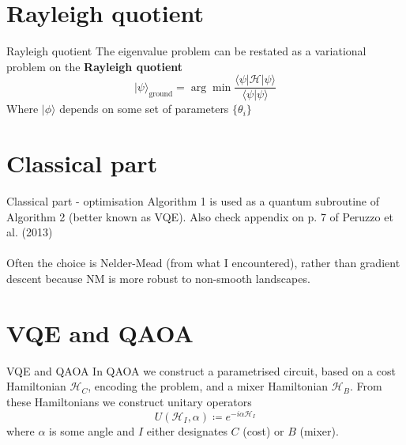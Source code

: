 \documentclass{beamer}
\renewcommand{\exp}[1]{\langle #1 \rangle} %
\begin{document}
\section{Rayleigh quotient}
\begin{frame}{Rayleigh quotient}
The eigenvalue problem can be restated as a variational problem on the \textbf{Rayleigh quotient}
\begin{equation}
	|\psi\rangle_{\text{ground}} = {\arg \min} \frac{\exp{\psi |\mathcal{H}|\psi}}{\exp{\psi|\psi}}
	\label{rayleigh}
\end{equation}
Where $|\phi\rangle$ depends on some set of parameters $\{\theta_i\}$

\end{frame}


\section{Classical part}
\begin{frame}{Classical part - optimisation}
	Algorithm 1 is used as a quantum subroutine of Algorithm 2 (better known as VQE). Also check appendix on p. 7 of Peruzzo et al. (2013)
	\\~\\
	Often the choice is Nelder-Mead (from what I encountered), rather than gradient descent because NM is more robust to non-smooth landscapes.
\end{frame}

\section{VQE and QAOA}
\begin{frame}{VQE and QAOA}
In QAOA we construct a parametrised circuit, based on a cost Hamiltonian $\mathcal{H}_C$, encoding the problem, and a mixer Hamiltonian $\mathcal{H}_B$. From these Hamiltonians we construct unitary operators
\begin{equation}
	U(\mathcal{H}_I,\alpha) \coloneq e^{-i\alpha \mathcal{H}_I}
\end{equation}
where $\alpha$ is some angle and $I$ either designates $C$ (cost) or $B$ (mixer).
\end{frame}
\end{document}
